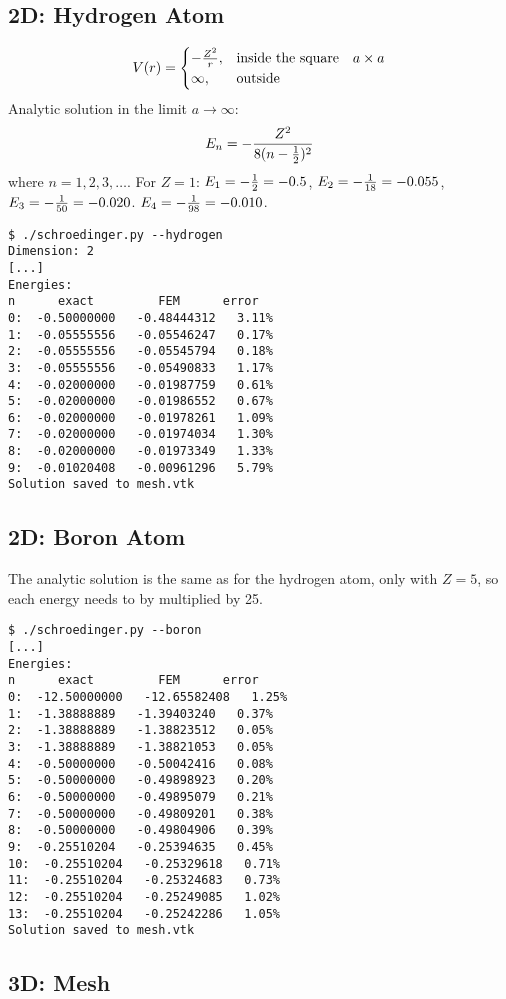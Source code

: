 \subsection{2D: Hydrogen Atom}

$$V(r)=\begin{cases}-{Z^2\over r},&\text{inside the square}\quad a\times a \\
\infty, & \text{outside}\end{cases}$$
Analytic solution in the limit $a\to\infty$:
$$E_n=-{Z^2\over8(n-{1\over2})^2}$$
where $n=1, 2, 3, \dots$.
For $Z=1$:
$E_1 = -{1\over2}=-0.5$,
$E_2 = -{1\over18}=-0.055$,
$E_3 = -{1\over50}=-0.020$.
$E_4 = -{1\over98}=-0.010$.

\begin{lstlisting}
$ ./schroedinger.py --hydrogen
Dimension: 2
[...]
Energies:
n      exact         FEM      error
0:  -0.50000000   -0.48444312   3.11%
1:  -0.05555556   -0.05546247   0.17%
2:  -0.05555556   -0.05545794   0.18%
3:  -0.05555556   -0.05490833   1.17%
4:  -0.02000000   -0.01987759   0.61%
5:  -0.02000000   -0.01986552   0.67%
6:  -0.02000000   -0.01978261   1.09%
7:  -0.02000000   -0.01974034   1.30%
8:  -0.02000000   -0.01973349   1.33%
9:  -0.01020408   -0.00961296   5.79%
Solution saved to mesh.vtk
\end{lstlisting}

\subsection{2D: Boron Atom}

The analytic solution is the same as for the hydrogen atom, only with $Z=5$,
so each energy needs to by multiplied by 25.

\begin{lstlisting}
$ ./schroedinger.py --boron
[...]
Energies:
n      exact         FEM      error
0:  -12.50000000   -12.65582408   1.25%
1:  -1.38888889   -1.39403240   0.37%
2:  -1.38888889   -1.38823512   0.05%
3:  -1.38888889   -1.38821053   0.05%
4:  -0.50000000   -0.50042416   0.08%
5:  -0.50000000   -0.49898923   0.20%
6:  -0.50000000   -0.49895079   0.21%
7:  -0.50000000   -0.49809201   0.38%
8:  -0.50000000   -0.49804906   0.39%
9:  -0.25510204   -0.25394635   0.45%
10:  -0.25510204   -0.25329618   0.71%
11:  -0.25510204   -0.25324683   0.73%
12:  -0.25510204   -0.25249085   1.02%
13:  -0.25510204   -0.25242286   1.05%
Solution saved to mesh.vtk
\end{lstlisting}

\subsection{3D: Mesh}


